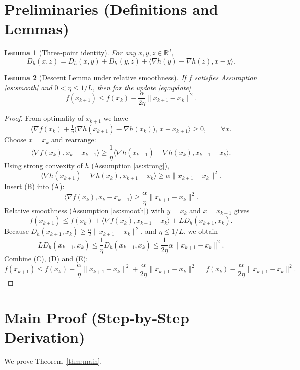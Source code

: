 \documentclass{article}
\newtheorem{lemma}{Lemma}
\newcommand{\Breg}{D_{h}}
\newcommand{\grad}{\nabla}
\newcommand{\R}{\mathbb{R}}
\begin{document}
\newpage
\section*{Preliminaries (Definitions and Lemmas)}

\begin{lemma}[Three‑point identity]\label{lem:3pt}
For any $x,y,z\in\R^{d}$,
\[
\Breg(x,z)=\Breg(x,y)+\Breg(y,z)+\langle \grad h(y)-\grad h(z),x-y\rangle .
\]
\end{lemma}

\begin{lemma}[Descent Lemma under relative smoothness]\label{lem:descent}
If $f$ satisfies Assumption \ref{as:smooth} and $0<\eta\le 1/L$, then for the update \eqref{eq:update}
\[
f(x_{k+1})\le f(x_{k})-\frac{\alpha}{2\eta}\|x_{k+1}-x_{k}\|^{2}.
\]
\end{lemma}
\begin{proof}
From optimality of $x_{k+1}$ we have
\[
\big\langle \grad f(x_{k})+\tfrac{1}{\eta}\big(\grad h(x_{k+1})-\grad h(x_{k})\big),\,x-x_{k+1}\big\rangle\ge0,
\qquad\forall x.
\]
Choose $x=x_{k}$ and rearrange:
\[
\langle \grad f(x_{k}),x_{k}-x_{k+1}\rangle\ge\frac{1}{\eta}\langle \grad h(x_{k+1})-\grad h(x_{k}),x_{k+1}-x_{k}\rangle .
\tag{A}
\]
Using strong convexity of $h$ (Assumption \ref{as:strong}),
\[
\langle \grad h(x_{k+1})-\grad h(x_{k}),x_{k+1}-x_{k}\rangle\ge\alpha\|x_{k+1}-x_{k}\|^{2}.
\tag{B}
\]
Insert (B) into (A):
\[
\langle \grad f(x_{k}),x_{k}-x_{k+1}\rangle\ge\frac{\alpha}{\eta}\|x_{k+1}-x_{k}\|^{2}.
\tag{C}
\]
Relative smoothness (Assumption \ref{as:smooth}) with $y=x_{k}$ and $x=x_{k+1}$ gives
\[
f(x_{k+1})\le f(x_{k})+\langle \grad f(x_{k}),x_{k+1}-x_{k}\rangle+L\Breg(x_{k+1},x_{k}).
\tag{D}
\]
Because $\Breg(x_{k+1},x_{k})\ge\frac{\alpha}{2}\|x_{k+1}-x_{k}\|^{2}$, and $\eta\le1/L$, we obtain
\[
L\Breg(x_{k+1},x_{k})\le\frac{1}{\eta}\Breg(x_{k+1},x_{k})
\le\frac{1}{2\eta}\alpha\|x_{k+1}-x_{k}\|^{2}.
\tag{E}
\]
Combine (C), (D) and (E):
\[
f(x_{k+1})\le f(x_{k})-\frac{\alpha}{\eta}\|x_{k+1}-x_{k}\|^{2}
+\frac{\alpha}{2\eta}\|x_{k+1}-x_{k}\|^{2}
= f(x_{k})-\frac{\alpha}{2\eta}\|x_{k+1}-x_{k}\|^{2}.
\]
\end{proof}

\section*{Main Proof (Step‑by‑Step Derivation)}
We prove Theorem~\ref{thm:main}.
\end{document}
